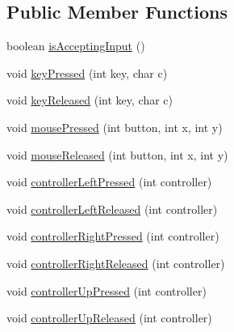 \subsection*{Public Member Functions}
\begin{DoxyCompactItemize}
\item 
boolean \mbox{\hyperlink{classorg_1_1newdawn_1_1slick_1_1command_1_1_input_provider_1_1_input_listener_impl_aafacc541954726a57251f0893750a9e4}{is\+Accepting\+Input}} ()
\item 
void \mbox{\hyperlink{classorg_1_1newdawn_1_1slick_1_1command_1_1_input_provider_1_1_input_listener_impl_a30a8b0de54af136b1579b3ec4c71f16b}{key\+Pressed}} (int key, char c)
\item 
void \mbox{\hyperlink{classorg_1_1newdawn_1_1slick_1_1command_1_1_input_provider_1_1_input_listener_impl_a2da6f6871609630698f578561063dcf9}{key\+Released}} (int key, char c)
\item 
void \mbox{\hyperlink{classorg_1_1newdawn_1_1slick_1_1command_1_1_input_provider_1_1_input_listener_impl_a7a660580dd4fbf3042c07d83d88022b7}{mouse\+Pressed}} (int button, int x, int y)
\item 
void \mbox{\hyperlink{classorg_1_1newdawn_1_1slick_1_1command_1_1_input_provider_1_1_input_listener_impl_a4d9fb1e92950944b899dc149357ed93a}{mouse\+Released}} (int button, int x, int y)
\item 
void \mbox{\hyperlink{classorg_1_1newdawn_1_1slick_1_1command_1_1_input_provider_1_1_input_listener_impl_a63696617ddee4b5ae49ab7bd892d14ee}{controller\+Left\+Pressed}} (int controller)
\item 
void \mbox{\hyperlink{classorg_1_1newdawn_1_1slick_1_1command_1_1_input_provider_1_1_input_listener_impl_ae67daea3a1e5b57c6189099410b17521}{controller\+Left\+Released}} (int controller)
\item 
void \mbox{\hyperlink{classorg_1_1newdawn_1_1slick_1_1command_1_1_input_provider_1_1_input_listener_impl_abe27fbc28db92a0549e5e61fd8ce81f1}{controller\+Right\+Pressed}} (int controller)
\item 
void \mbox{\hyperlink{classorg_1_1newdawn_1_1slick_1_1command_1_1_input_provider_1_1_input_listener_impl_a5703b6c8734b6d797edeecf4c3e27985}{controller\+Right\+Released}} (int controller)
\item 
void \mbox{\hyperlink{classorg_1_1newdawn_1_1slick_1_1command_1_1_input_provider_1_1_input_listener_impl_a6e6f72ea130bc39ce0d96db6d4f80d8c}{controller\+Up\+Pressed}} (int controller)
\item 
void \mbox{\hyperlink{classorg_1_1newdawn_1_1slick_1_1command_1_1_input_provider_1_1_input_listener_impl_a44338713bf5dfac2e16ced2d29c921bc}{controller\+Up\+Released}} (int controller)

\end{DoxyCompactItemize}
